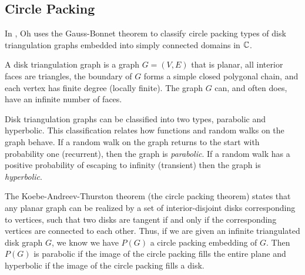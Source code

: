 \subsection{Circle Packing}
\label{sec:circle-packing}

In \cite{oh_criteria_2022}, Oh uses the Gauss-Bonnet theorem to classify
circle packing types of disk triangulation graphs embedded into simply
connected domains in $\mathbb{C}$.

A disk triangulation graph is a graph $G=(V,E)$ that is planar, all interior faces
are triangles, the boundary of $G$ forms a simple closed polygonal chain, and each
vertex has finite degree (locally finite). The graph $G$ can, and often does, have
an infinite number of faces.

Disk triangulation graphs can be classified into two types, parabolic and hyperbolic.
This classification relates how functions and random walks on the graph behave.
If a random walk on the graph returns to the start with probability one (recurrent),
then the graph is \emph{parabolic}. If a random walk has a positive probability of escaping to
infinity (transient) then the graph is \emph{hyperbolic}.

The Koebe-Andreev-Thurston theorem (the circle packing theorem) states
that any planar graph can be realized by a set of interior-disjoint disks corresponding to vertices,
such that two disks are tangent if and only if the corresponding vertices are connected
to each other. Thus, if we are given an infinite triangulated disk graph
$G$, we know we have $P(G)$ a circle packing embedding of $G$.
Then $P(G)$ is parabolic if the image of the circle packing fills the entire plane
and hyperbolic if the image of the circle packing fills a disk.


